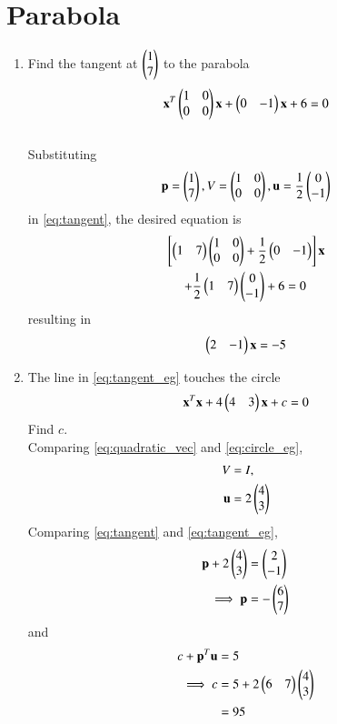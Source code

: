 \documentclass[journal,12pt,twocolumn]{IEEEtran}
\renewcommand\thesection{\arabic{section}}
\begin{document}
\section{Parabola}
\begin{enumerate}[label=\thesection.\arabic*
,ref=\thesection.\theenumi]
\item Find the tangent at $\begin{pmatrix}1 \\ 7\end{pmatrix}$ to the parabola
\begin{equation}
\mathbf{x}^T\begin{pmatrix}1 & 0 \\ 0 & 0\end{pmatrix}\mathbf{x} + \begin{pmatrix}0 & -1\end{pmatrix}\mathbf{x} + 
6 = 0
\end{equation}
\\
\solution Substituting
\begin{equation}
\mathbf{p} = \begin{pmatrix}1 \\ 7\end{pmatrix}, V = \begin{pmatrix}1 & 0 \\ 0 & 0\end{pmatrix}, \mathbf{u} = \frac{1}{2}\begin{pmatrix}0 \\ -1\end{pmatrix}
\end{equation}
%
in \eqref{eq:tangent}, the desired equation is
\begin{multline}
{}\left[\begin{pmatrix} 1 & 7\end{pmatrix}\begin{pmatrix}1 & 0 \\ 0 & 0\end{pmatrix}+\frac{1}{2}\begin{pmatrix}0 & -1\end{pmatrix}\right]\mathbf{x} 
\\
+ \frac{1}{2}\begin{pmatrix} 1 & 7\end{pmatrix}\begin{pmatrix}0 \\
-1\end{pmatrix} 
+6 = 0
\end{multline}
resulting in
\begin{equation}
\begin{pmatrix} 2 & -1\end{pmatrix}\mathbf{x} 
 = -5
\label{eq:tangent_eg}
\end{equation}
\item The line in \eqref{eq:tangent_eg}
touches the circle
\begin{equation}
\mathbf{x}^T\mathbf{x} + 4 \begin{pmatrix}4 & 3\end{pmatrix}\mathbf{x} + c = 0
\label{eq:circle_eg}
\end{equation}
Find $c$.
\\
\solution Comparing \eqref{eq:quadratic_vec} and \eqref{eq:circle_eg},
\begin{align}
\begin{split}
V &= I,
\\
\mathbf{u} &= 2 \begin{pmatrix}4 \\ 3\end{pmatrix}
\end{split}
\end{align}
%
Comparing \eqref{eq:tangent} and \eqref{eq:tangent_eg},
\begin{align}
\mathbf{p}+2 \begin{pmatrix}4 \\ 3\end{pmatrix} &= \begin{pmatrix}2 \\ -1\end{pmatrix}
\\
\implies \mathbf{p} &= -\begin{pmatrix}6 \\ 7\end{pmatrix}
\end{align}
%
and
\begin{align}
c +\mathbf{p}^T\mathbf{u}&= 5
\\
\implies c &= 5+2\begin{pmatrix}6 & 7\end{pmatrix}  \begin{pmatrix}4 \\ 3\end{pmatrix}
\\
 &= 95
\end{align}
\end{enumerate}
\end{document}
